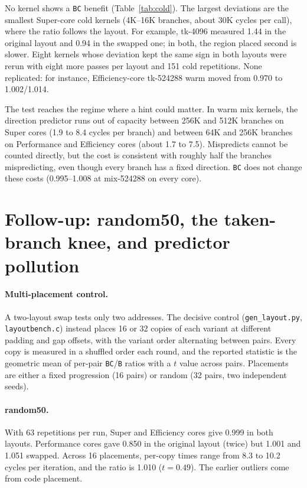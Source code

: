 \documentclass[10pt]{article}
\begin{document}
No kernel shows a \texttt{BC} benefit (Table~\ref{tab:cold}). The largest deviations are the
smallest Super-core cold kernels (4K--16K branches, about 30K cycles per call), where the
ratio follows the layout. For example, tk-4096 measured 1.44 in the original layout and 0.94
in the swapped one; in both, the region placed second is slower. Eight kernels whose deviation
kept the same sign in both layouts were rerun with eight more passes per layout and 151 cold
repetitions. None replicated: for instance, Efficiency-core tk-524288 warm moved from 0.970 to
1.002/1.014.

The test reaches the regime where a hint could matter. In warm mix kernels, the direction
predictor runs out of capacity between 256K and 512K branches on Super cores (1.9 to 8.4
cycles per branch) and between 64K and 256K branches on Performance and Efficiency cores
(about 1.7 to 7.5). Mispredicts cannot be counted directly, but the cost is consistent with
roughly half the branches mispredicting, even though every branch has a fixed direction. \texttt{BC} does not change these costs (0.995--1.008 at
mix-524288 on every core).

\section{Follow-up: random50, the taken-branch knee, and predictor pollution}
\label{sec:followup}
\paragraph{Multi-placement control.} A two-layout swap tests only two addresses. The
decisive control (\texttt{gen\_layout.py}, \texttt{layoutbench.c}) instead places 16 or 32
copies of each variant at different padding and gap offsets, with the variant order
alternating between pairs. Every copy is measured in a shuffled order each round, and the
reported statistic is the geometric mean of per-pair \texttt{BC}/\texttt{B} ratios with a
$t$ value across pairs. Placements are either a fixed progression (16 pairs) or random
(32 pairs, two independent seeds).

\paragraph{random50.} With 63 repetitions per run, Super and Efficiency cores give
0.999 in both layouts. Performance cores gave 0.850 in the original layout (twice) but
1.001 and 1.051 swapped. Across 16 placements, per-copy times range from 8.3 to 10.2 cycles
per iteration, and the ratio is 1.010 ($t=0.49$). The earlier outliers come from code placement.
\end{document}
